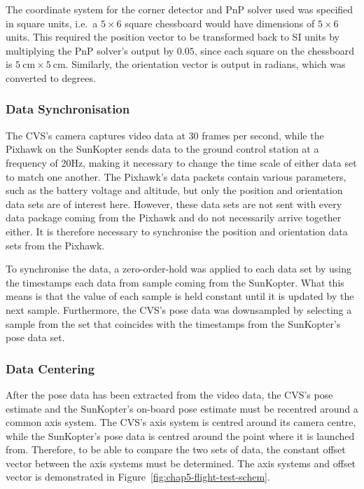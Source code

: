 The coordinate system for the corner detector and PnP solver used was specified in square units, i.e.\ a $5\times6$ square chessboard would have dimensions of $5\times6$ units. This required the position vector to be transformed back to SI units by multiplying the PnP solver's output by $0.05$, since each square on the chessboard is $\SI{5}{\cm}\times\SI{5}{\cm}$. Similarly, the orientation vector is output in radians, which was converted to degrees. 

\subsubsection{Data Synchronisation}

The CVS's camera captures video data at 30 frames per second, while the Pixhawk on the SunKopter sends data to the ground control station at a frequency of 20Hz, making it necessary to change the time scale of either data set to match one another. The Pixhawk's data packets contain various parameters, such as the battery voltage and altitude, but only the position and orientation data sets are of interest here. However, these data sets are not sent with every data package coming from the Pixhawk and do not necessarily arrive together either. It is therefore necessary to synchronise the position and orientation data sets from the Pixhawk.

To synchronise the data, a zero-order-hold was applied to each data set by using the timestamps each data from sample coming from the SunKopter. What this means is that the value of each sample is held constant until it is updated by the next sample. Furthermore, the CVS's pose data was downsampled by selecting a sample from the set that coincides with the timestamps from the SunKopter's pose data set. 

\subsubsection{Data Centering}
\label{sec:chap5-data-centring}

After the pose data has been extracted from the video data, the CVS's pose estimate and the SunKopter's on-board pose estimate must be recentred around a common axis system. The CVS's axis system is centred around its camera centre, while the SunKopter's pose data is centred around the point where it is launched from. Therefore, to be able to compare the two sets of data, the constant offset vector between the axis systems must be determined. The axis systems and offset vector is demonstrated in Figure~\ref{fig:chap5-flight-test-schem}.

